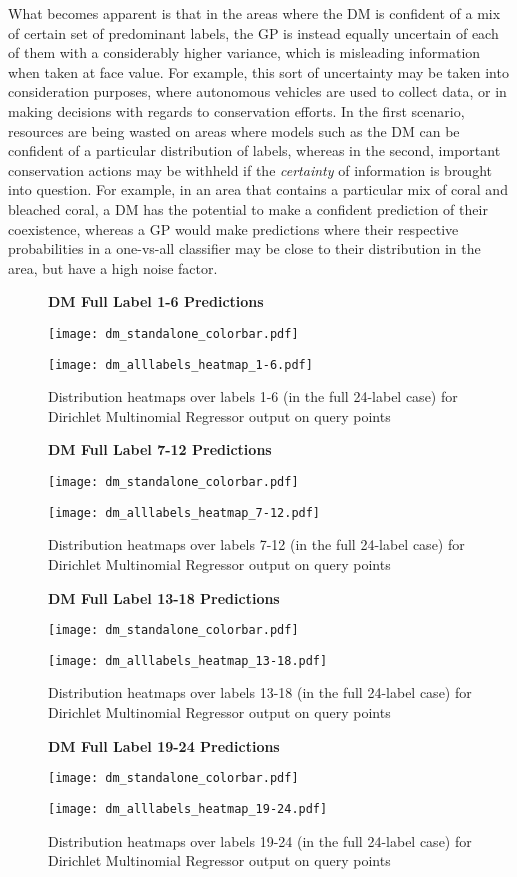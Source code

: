 
What becomes apparent is that in the areas where the DM is confident of a mix of certain set of predominant labels, the GP is instead equally uncertain of each of them with a considerably higher variance, which is misleading information when taken at face value. For example, this sort of uncertainty may be taken into consideration purposes, where autonomous vehicles are used to collect data, or in making decisions with regards to conservation efforts. In the first scenario, resources are being wasted on areas where models such as the DM can be confident of a particular distribution of labels, whereas in the second, important conservation actions may be withheld if the \textit{certainty} of information is brought into question. For example, in an area that contains a particular mix of coral and bleached coral, a DM has the potential to make a confident prediction of their coexistence, whereas a GP would make predictions where their respective probabilities in a one-vs-all classifier may be close to their distribution in the area, but have a high noise factor.

\begin{figure}[H]
    \textbf{DM Full Label 1-6 Predictions}
    \centerline{\texttt{[image: dm\_standalone\_colorbar.pdf]}}
    \centerline{\texttt{[image: dm\_alllabels\_heatmap\_1-6.pdf]}}
    \caption{Distribution heatmaps over labels 1-6 (in the full 24-label case) for Dirichlet Multinomial Regressor output on query points}
    \label{fig:dm_24-1_label_heatmap}
    \hfill
\end{figure}
\begin{figure}[H]
    \textbf{DM Full Label 7-12 Predictions}
    \centerline{\texttt{[image: dm\_standalone\_colorbar.pdf]}}
    \centerline{\texttt{[image: dm\_alllabels\_heatmap\_7-12.pdf]}}
    \caption{Distribution heatmaps over labels 7-12 (in the full 24-label case) for Dirichlet Multinomial Regressor output on query points}
    \label{fig:dm_24-2_label_heatmap}
    \hfill
\end{figure}
\begin{figure}[H]
    \textbf{DM Full Label 13-18 Predictions}
    \centerline{\texttt{[image: dm\_standalone\_colorbar.pdf]}}
    \centerline{\texttt{[image: dm\_alllabels\_heatmap\_13-18.pdf]}}
    \caption{Distribution heatmaps over labels 13-18 (in the full 24-label case) for Dirichlet Multinomial Regressor output on query points}
    \label{fig:dm_24-3_label_heatmap}
    \hfill
\end{figure}
\begin{figure}[H]
    \textbf{DM Full Label 19-24 Predictions}
    \centerline{\texttt{[image: dm\_standalone\_colorbar.pdf]}}
    \centerline{\texttt{[image: dm\_alllabels\_heatmap\_19-24.pdf]}}
    \caption{Distribution heatmaps over labels 19-24 (in the full 24-label case) for Dirichlet Multinomial Regressor output on query points}
    \label{fig:dm_24-4_label_heatmap}
    \hfill
\end{figure}

